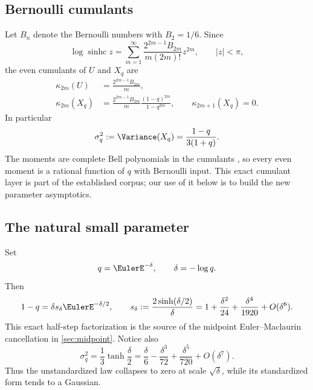 \documentclass[11pt,a4paper]{article}
\theoremstyle{definition}
\newcommand{\sinhc}{\operatorname{sinhc}}
\begin{document}
\subsection{Bernoulli cumulants}

Let $B_n$ denote the Bernoulli numbers with $B_2=1/6$.  Since
\begin{equation}
 \log\sinhc z
 =\sum_{m=1}^{\infty}
   \frac{2^{2m-1}B_{2m}}{m(2m)!}z^{2m},
 \qquad |z|<\pi,
 \label{eq:logsinhc-series}
\end{equation}
the even cumulants of $U$ and $X_q$ are
\begin{align}
 \kappa_{2m}(U)&=\frac{2^{2m-1}B_{2m}}{m},
 \label{eq:uniform-cumulants}\\
 \kappa_{2m}(X_q)&=\frac{2^{2m-1}B_{2m}}{m}
     \frac{(1-q)^{2m}}{1-q^{2m}},
 \qquad \kappa_{2m+1}(X_q)=0.
 \label{eq:Xq-cumulants}
\end{align}
In particular
\begin{equation}
 \sigma_q^2:=\Variance(X_q)=\frac{1-q}{3(1+q)}.
 \label{eq:variance}
\end{equation}
The moments are complete Bell polynomials in the cumulants \cite{Comtet}, so every even
moment is a rational function of $q$ with Bernoulli input.  This exact
cumulant layer is part of the established corpus; our use of it below is to
build the new parameter asymptotics.

\subsection{The natural small parameter}

Set
\begin{equation}
 q=\EulerE^{-\delta},\qquad \delta=-\log q.
 \label{eq:delta}
\end{equation}
Then
\begin{equation}
 1-q=\delta s_\delta \EulerE^{-\delta/2},
 \qquad
 s_\delta:=\frac{2\sinh(\delta/2)}{\delta}
 =1+\frac{\delta^2}{24}+\frac{\delta^4}{1920}+O(\delta^6).
 \label{eq:sdelta}
\end{equation}
This exact half-step factorization is the source of the midpoint
Euler--Maclaurin cancellation in \cref{sec:midpoint}.  Notice also
\begin{equation}
 \sigma_q^2=\frac13\tanh\frac{\delta}{2}
 =\frac{\delta}{6}-\frac{\delta^3}{72}
   +\frac{\delta^5}{720}+O(\delta^7).
 \label{eq:variance-delta}
\end{equation}
Thus the unstandardized law collapses to zero at scale $\sqrt\delta$, while
its standardized form tends to a Gaussian.
\end{document}
